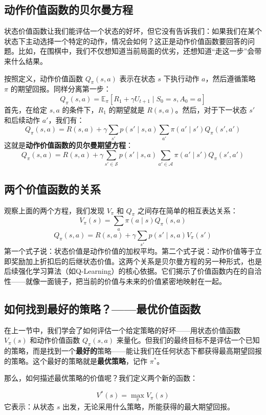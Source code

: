 \documentclass[lang=cn,zihao=-4,a4paper,fontset=windows]{beautybook}
\begin{document}
\subsection{动作价值函数的贝尔曼方程}

状态价值函数让我们能评估一个状态的好坏，但它没有告诉我们：如果我们在某个状态下主动选择一个特定的动作，情况会如何？这正是动作价值函数要回答的问题。比如，在围棋中，我们不仅想知道当前局面的优劣，还想知道“走这一步”会带来什么结果。

按照定义，动作价值函数 $Q_\pi(s,a)$ 表示在状态 $s$ 下执行动作 $a$，然后遵循策略 $\pi$ 的期望回报。同样分离第一步：
\[
Q_\pi(s,a) = \mathbb{E}_\pi\left[ R_1 + \gamma U_{t+1} \mid S_0=s, A_0=a \right]
\]
首先，在给定 $s,a$ 的条件下，$R_1$ 的期望就是 $R(s,a)$。然后，对于下一状态 $s'$ 和后续动作 $a'$，我们有：
\[
Q_\pi(s,a) = R(s,a) + \gamma \sum_{s'} p(s'\mid s,a) \sum_{a'} \pi(a'\mid s') Q_\pi(s',a')
\]
这就是\textbf{动作价值函数的贝尔曼期望方程}：
\[
\boxed{Q_\pi(s,a) = R(s,a) + \gamma \sum_{s' \in \mathcal{S}} p(s' \mid s, a) \sum_{a' \in \mathcal{A}} \pi(a' \mid s') Q_\pi(s', a')}
\]

\subsection{两个价值函数的关系}

观察上面的两个方程，我们发现 $V_\pi$ 和 $Q_\pi$ 之间存在简单的相互表达关系：
\[
V_\pi(s) = \sum_a \pi(a\mid s) Q_\pi(s,a)
\]
\[
Q_\pi(s,a) = R(s,a) + \gamma \sum_{s'} p(s'\mid s,a) V_\pi(s')
\]
第一个式子说：状态价值是动作价值的加权平均。第二个式子说：动作价值等于立即奖励加上折扣后的后继状态价值。这两个关系是贝尔曼方程的另一种形式，也是后续强化学习算法（如Q-Learning）的核心依据。它们揭示了价值函数内在的自洽性——就像一面镜子，把当前的价值与未来的价值紧密地映射在一起。

\subsection{如何找到最好的策略？——最优价值函数}

在上一节中，我们学会了如何评估一个给定策略的好坏——用状态价值函数 $V_\pi(s)$ 和动作价值函数 $Q_\pi(s,a)$ 来量化。但我们的最终目标不是评估一个已知的策略，而是找到一个\textbf{最好的}策略——能让我们在任何状态下都获得最高期望回报的策略。这个最好的策略就是\textbf{最优策略}，记作 $\pi^*$。

那么，如何描述最优策略的价值呢？我们定义两个新的函数：

\begin{definition}[][最优状态价值函数 $V^*(s)$]
\[
V^*(s) = \max_{\pi} V_\pi(s)
\]
它表示：从状态 $s$ 出发，无论采用什么策略，所能获得的最大期望回报。
\end{definition}
\end{document}
